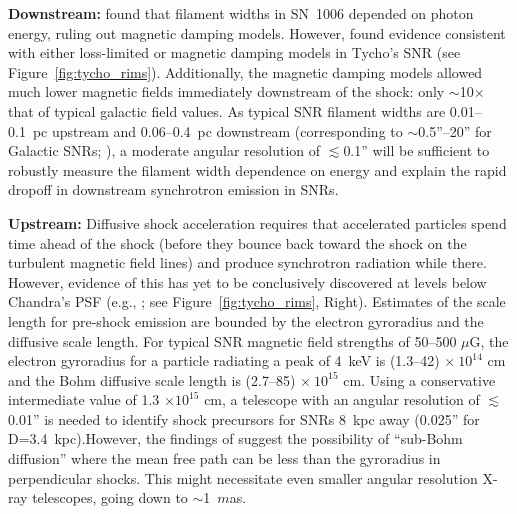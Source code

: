 \documentclass{article}
\begin{document}
\textbf{Downstream:} \cite{2014ApJ...790...85R} found that filament widths in SN~1006 depended on photon energy, ruling out magnetic damping models. However, \cite{2015ApJ...812..101T} found evidence consistent with either loss-limited or magnetic damping models in Tycho's SNR (see Figure~\ref{fig:tycho_rims}). Additionally, the magnetic damping models allowed much lower magnetic fields immediately downstream of the shock: only $\sim$10$\times$ that of typical galactic field values. As typical SNR filament widths are 0.01--0.1~pc upstream and 0.06--0.4~pc downstream (corresponding to $\sim$0.5''--20'' for Galactic SNRs; \cite{2005ApJ...621..793B}), a moderate angular resolution of $\lesssim$0.1'' will be sufficient to robustly measure the filament width dependence on energy and explain the rapid dropoff in downstream synchrotron emission in SNRs.

\textbf{Upstream:} Diffusive shock acceleration requires that accelerated particles spend time ahead of the shock (before they bounce back toward the shock on the turbulent magnetic field lines) and produce synchrotron radiation while there. However, evidence of this has yet to be conclusively discovered at levels below Chandra's PSF (e.g., \cite{2014ApJ...781...65W}; see Figure~\ref{fig:tycho_rims}, Right). Estimates of the scale length for pre-shock emission are bounded by the electron gyroradius and the diffusive scale length. For typical SNR magnetic field strengths of 50--500 $\mu$G, the electron gyroradius for a particle radiating a peak of 4~keV is (1.3--42) $\times \ 10^{14}$ cm and the Bohm diffusive scale length is (2.7--85) $\times \ 10^{15}$ cm. Using a conservative intermediate value of 1.3 $\times 10^{15}$ cm, a telescope with an angular resolution of $\lesssim$0.01'' is needed to identify shock precursors for SNRs 8~kpc away (0.025'' for D=3.4~kpc).However, the findings of \cite{2014ApJ...790...85R} suggest the possibility of ``sub-Bohm diffusion'' where the mean free path can be less than the gyroradius in perpendicular shocks. This might necessitate even smaller angular resolution X-ray telescopes, going down to $\sim$1~$m$as.
\end{document}
